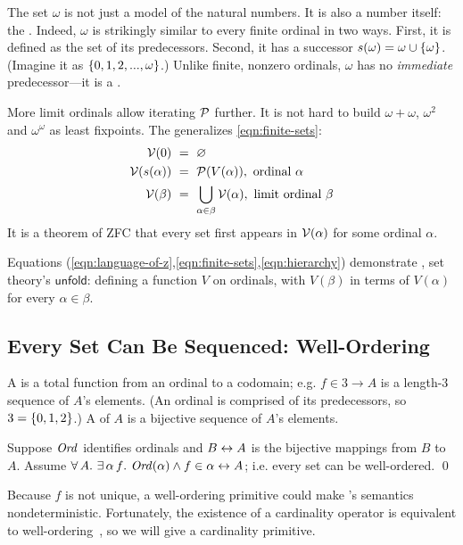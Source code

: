 The set $\omega$ is not just a model of the natural numbers. It is also a number itself: the . Indeed, $\omega$ is strikingly similar to every finite ordinal in two ways. First, it is defined as the set of its predecessors. Second, it has a successor $s(\omega) = \omega \cup \{{\omega}\}$. (Imagine it as $\{{0,1,2,...,\omega}\}$.) Unlike finite, nonzero ordinals, $\omega$ has no \emph{immediate} predecessor---it is a .

More limit ordinals allow iterating $\mathcal{P}$ further. It is not hard to build $\omega + \omega$, $\omega^2$ and $\omega^\omega$ as least fixpoints. The  generalizes \eqref{eqn:finite-sets}:
\begin{equation}
\begin{aligned}
	\V(0) &\ =\ \emptyset \\
	\V(s(\alpha)) &\ =\ \powerset(V(\alpha)),\ \text{ordinal } \alpha \\
	\V(\beta) &\ =\ \bigcup_{\alpha \in \beta} \V(\alpha),\ \text{limit ordinal } \beta
\end{aligned}
\label{eqn:hierarchy}
\end{equation}
It is a theorem of ZFC that every set first appears in $\mathcal{V}(\alpha)$ for some ordinal $\alpha$.

Equations (\ref{eqn:language-of-z},\ref{eqn:finite-sets},\ref{eqn:hierarchy}) demonstrate , set theory's $\mathsf{unfold}$: defining a function $V$ on ordinals, with $V(\beta)$ in terms of $V(\alpha)$ for every $\alpha \in \beta$.

\subsection{Every Set Can Be Sequenced: Well-Ordering}

A  is a total function from an ordinal to a codomain; e.g. $f \in 3 \to A$ is a length-$3$ sequence of $A$'s elements. (An ordinal is comprised of its predecessors, so $3 = \{{0,1,2}\}$.) A  of $A$ is a bijective sequence of $A$'s elements.
\begin{axiom}
Suppose $\mathit{Ord}$ identifies ordinals and $B \leftrightarrow A$ is the bijective mappings from $B$ to $A$. Assume $\forall\,{A}\ldotp\,\exists\,{\alpha\,f}\ldotp\,\mathit{Ord}(\alpha) \wedge f \in \alpha \leftrightarrow A$; i.e. every set can be well-ordered.
\qed
\end{axiom}
Because $f$ is not unique, a well-ordering primitive could make \targetlang's semantics nondeterministic.
Fortunately, the existence of a cardinality operator is equivalent to well-ordering~\cite{cit:tzouvaras-2005sl-card}, so we will give \targetlang a cardinality primitive.

